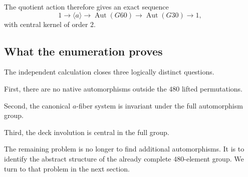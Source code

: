 The quotient action therefore gives an exact sequence
\[
1
\longrightarrow
\langle a\rangle
\longrightarrow
\operatorname{Aut}(G60)
\longrightarrow
\operatorname{Aut}(G30)
\longrightarrow
1,
\]
with central kernel of order $2$.

\subsection{What the enumeration proves}

The independent calculation closes three logically distinct questions.

First, there are no native automorphisms outside the $480$ lifted
permutations.

Second, the canonical $a$-fiber system is invariant under the full
automorphism group.

Third, the deck involution is central in the full group.

The remaining problem is no longer to find additional automorphisms. It
is to identify the abstract structure of the already complete
$480$-element group. We turn to that problem in the next section.

